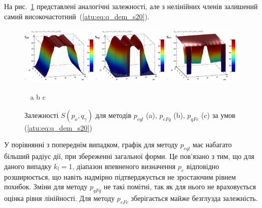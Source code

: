 На рис.~\ref{atu:f:qsl_S_po_qg_s20} представлені аналогічні залежності,
але з нелінійних членів залишений самий високочастотний~(\ref{atu:eq:q_dem_s20}).

\begin{figure}[htb!]
  \begin{center}
    \includegraphics[width=0.32\textwidth]{p/qls_pe-p_po_qg_Sql_s20.png}
    \hfill
    \includegraphics[width=0.32\textwidth]{p/qls_pe-p_po_qg_SFq_s20.png}
    \hfill
    \includegraphics[width=0.32\textwidth]{p/qls_pe-p_po_qg_SFc_s20.png}
  \end{center}
  \vspace{-1.0ex}
  \begin{center}
    ~ \hfill a \hfill\hfill b \hfill\hfill c \hfill ~
  \end{center}
  \vspace{-1.5ex}
  \caption{Залежності $S(p_o,q_\gamma)$ для методів $p_{eql}$ (a), $p_{eFq}$ (b), $p_{qFc}$ (c) за умов (\ref{atu:eq:q_dem_s20})}
  \label{atu:f:qsl_S_po_qg_s20}
\end{figure}

У порівнянні з попереднім випадком, графік для методу
$ p_{eql} $ має набагато більший радіус дії, при збереженні загальної
форми. Це пов'язано з тим, що для даного випадку
$ k_l = 1 $, діапазон впевненого визначення
$ p_e $ відповідно розширюється, що навіть надмірно
підтверджується не зростаючим рівнем похибок. Зміни для методу
$ p_{qFq} $ не такі помітні, так як для нього не враховується оцінка
рівня лінійності. Для методу
$ p_{eFc} $ зберігається майже безглузда залежність.

